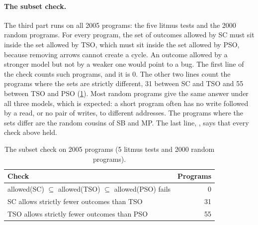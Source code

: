 \paragraph{The subset check.} The third part runs on all 2005 programs: the five litmus tests and the 2000 random programs. For every program, the set of outcomes allowed by SC must sit inside the set allowed by TSO, which must sit inside the set allowed by PSO, because removing arrows cannot create a cycle. An outcome allowed by a stronger model but not by a weaker one would point to a bug. The first line of the check counts such programs, and it is 0. The other two lines count the programs where the sets are strictly different, 31 between SC and TSO and 55 between TSO and PSO (\cref{tab:subset}). Most random programs give the same answer under all three models, which is expected: a short program often has no write followed by a read, or no pair of writes, to different addresses. The programs where the sets differ are the random cousins of SB and MP. The last line, , says that every check above held.

\begin{table}[!htbp]
\centering\small
\caption{The subset check on 2005 programs (5 litmus tests and 2000 random programs).}
\label{tab:subset}
\begin{tabular}{@{}lr@{}}
\toprule
Check & Programs\\
\midrule
allowed(SC) $\subseteq$ allowed(TSO) $\subseteq$ allowed(PSO) fails & 0\\
SC allows strictly fewer outcomes than TSO & 31\\
TSO allows strictly fewer outcomes than PSO & 55\\
\bottomrule
\end{tabular}
\end{table}

